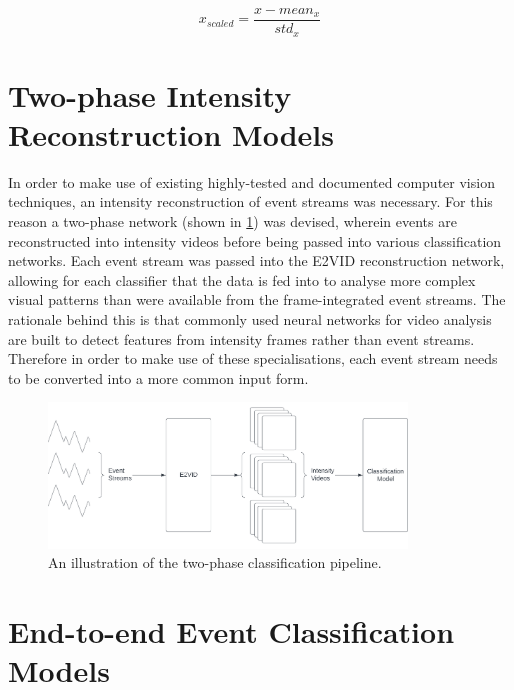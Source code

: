 \begin{equation}
    x_{scaled} = \frac{x - mean_x}{std_x}
    \label{eq:z_score}
\end{equation}

\section{Two-phase Intensity Reconstruction Models}

In order to make use of existing highly-tested and documented computer vision techniques, an intensity reconstruction of event streams was necessary. For this reason a two-phase network (shown in \cref{fig:two_phase_network_pipeline}) was devised, wherein events are reconstructed into intensity videos before being passed into various classification networks. Each event stream was passed into the E2VID reconstruction network\cite{spikingToVideo}, allowing for each classifier that the data is fed into to analyse more complex visual patterns than were available from the frame-integrated event streams. The rationale behind this is that commonly used neural networks for video analysis are built to detect features from intensity frames rather than event streams. Therefore in order to make use of these specialisations, each event stream needs to be converted into a more common input form.

\begin{figure}[htb]
    \centering
    \includegraphics[width=0.85\textwidth]{analysisanddesign/images/two_phase_network_pipeline.png}
    \caption{An illustration of the two-phase classification pipeline.}
    \label{fig:two_phase_network_pipeline}
\end{figure}

\section{End-to-end Event Classification Models} \label{sec:end_to_end_classification_design}

